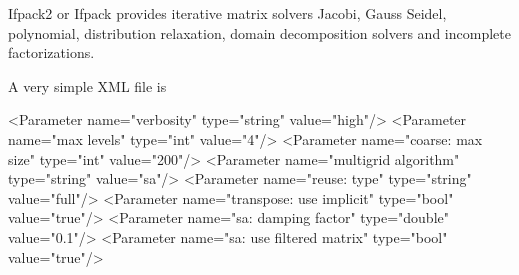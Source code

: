 Ifpack2 or Ifpack provides iterative matrix solvers Jacobi, Gauss Seidel, polynomial, distribution relaxation, domain decomposition solvers and incomplete factorizations.


A very simple XML file is
\begin{python}[caption=simplebob.xml,label=simplebob]
  <Parameter name="verbosity"               type="string"    value="high"/> 
  <Parameter name="max levels"              type="int"       value="4"/>
  <Parameter name="coarse: max size"        type="int"       value="200"/>
  <Parameter name="multigrid algorithm"     type="string"    value="sa"/>
  <Parameter name="reuse: type"             type="string"    value="full"/>
  <Parameter name="transpose: use implicit" type="bool"      value="true"/>
  <Parameter name="sa: damping factor"      type="double"    value="0.1"/> 
  <Parameter name="sa: use filtered matrix" type="bool"      value="true"/>
\end{python}

